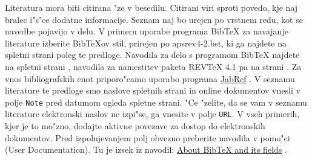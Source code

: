 Literatura mora biti citirana "ze v besedilu. Citirani viri sproti povedo, kje naj 
bralec i"s"ce dodatne informacije.  Seznam naj bo urejen po vrstnem redu, kot se 
navedbe pojavijo v delu.  V primeru uporabe programa {Bib\TeX} za navajanje literature 
izberite Bib\TeX{ov} stil, prirejen po apsrev4-2.bst, ki ga najdete na spletni strani 
poleg te predloge.  Navodila za delo s programom {Bib\TeX} najdete na spletni strani 
\cite{Bib}, navodila za namestitev paketa REVTeX 4.1 pa na strani \cite{Rev}.  Za vnos 
bibliografskih enot priporo"camo uporabo programa \href{http://www.jabref.org/}{JabRef} 
\cite{JR}.  V seznamu literature te predloge smo naslove spletnih strani in online 
dokumentov vnesli v polje {\tt Note} pred datumom ogleda spletne strani.  "Ce "zelite, 
da se vam v seznamu literature elektronski naslov ne izpi"se, ga vnesite v polje 
{\tt URL}.  V vseh primerih, kjer je to mo"zno, dodajte aktivne povezave za dostop 
do elektronskih dokumentov.  Pred izpolnjevanjem polj obvezno preberite navodila 
v pomo"ci (User Documentation). Tu je izsek iz navodil: 
\href{https://docs.jabref.org/advanced/fields}{About BibTeX and its fields} \cite{Help}.\\

